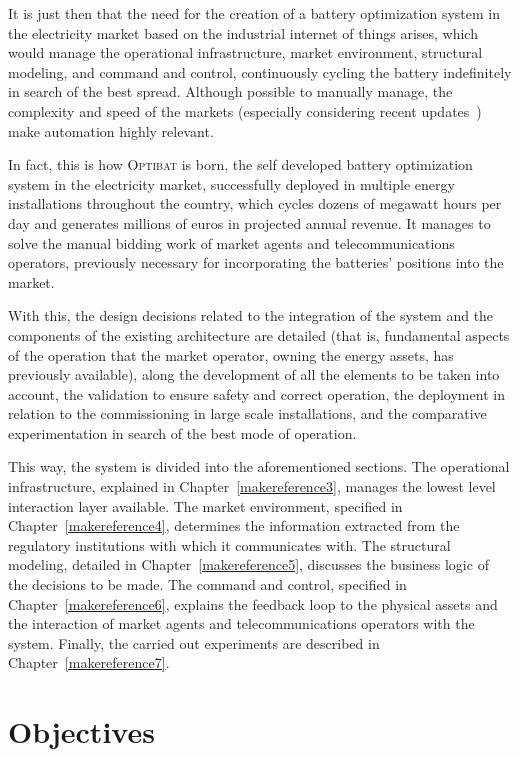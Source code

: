 It is just then that the need for the creation of a battery optimization system in the electricity market based on the industrial internet of things arises, which would manage the operational infrastructure, market environment, structural modeling, and command and control, continuously cycling the battery indefinitely in search of the best spread. Although possible to manually manage, the complexity and speed of the markets (especially considering recent updates~\cite{cnmc2025resolucion, omie2025instruccion}) make automation highly relevant.

In fact, this is how \textsc{Optibat} is born, the self developed battery optimization system in the electricity market, successfully deployed in multiple energy installations throughout the country, which cycles dozens of megawatt hours per day and generates millions of euros in projected annual revenue. It manages to solve the manual bidding work of market agents and telecommunications operators, previously necessary for incorporating the batteries' positions into the market.

With this, the design decisions related to the integration of the system and the components of the existing architecture are detailed (that is, fundamental aspects of the operation that the market operator, owning the energy assets, has previously available), along the development of all the elements to be taken into account, the validation to ensure safety and correct operation, the deployment in relation to the commissioning in large scale installations, and the comparative experimentation in search of the best mode of operation.

This way, the system is divided into the aforementioned sections. The operational infrastructure, explained in Chapter~\ref{makereference3}, manages the lowest level interaction layer available. The market environment, specified in Chapter~\ref{makereference4}, determines the information extracted from the regulatory institutions with which it communicates with. The structural modeling, detailed in Chapter~\ref{makereference5}, discusses the business logic of the decisions to be made. The command and control, specified in Chapter~\ref{makereference6}, explains the feedback loop to the physical assets and the interaction of market agents and telecommunications operators with the system. Finally, the carried out experiments are described in Chapter~\ref{makereference7}.

\section*{Objectives}%
\label{makereference9.1}

